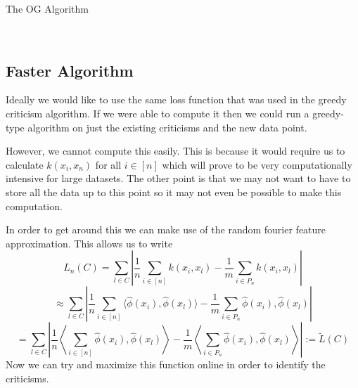 \documentclass{article}
\begin{document}
	
	\begin{algorithm}
		\caption{The OG Algorithm}\label{OnlineGreedy}
		\begin{algorithmic}[1]
			
			\EndIf
			\EndFor\\
			
		\end{algorithmic}
	\end{algorithm}
	
	\subsection{Faster Algorithm}
	Ideally we would like to use the same loss function that was used in the greedy criticism algorithm. If we were able to compute it then we could run a greedy-type algorithm on just the existing criticisms and the new data point. 
	
	However, we cannot compute this easily. This is because it would require us to calculate $k(x_i, x_n)$ for all $i \in \left[ n \right]$ which will prove to be very computationally intensive for large datasets. The other point is that we may not want to have to store all the data up to this point so it may not even be possible to make this computation. 
	
	In order to get around this we can make use of the random fourier feature approximation. This allows us to write 
	\begin{equation}
	L_n(C) = \sum_{l \in C}\left| \frac{1}{n}\sum_{i \in \left[ n \right]}k(x_i, x_l) - \frac{1}{m}\sum_{i \in P_n}k(x_i, x_l) \right|
	\end{equation}
	\begin{equation}
	\approx
	\sum_{l \in C}\left| \frac{1}{n}
	\sum_{i \in \left[ n \right]}\langle \hat{\phi}(x_i),  \hat{\phi}(x_l)\rangle 
	- \frac{1}{m}
	\sum_{i \in P_n}\hat{\phi}(x_i),  \hat{\phi}(x_l) \right| 
	\end{equation}	
	\begin{equation}
	= 
	\sum_{l \in C}\left| \frac{1}{n}
	\left\langle 
	\sum_{i \in \left[ n \right]}\hat{\phi}(x_i),  \hat{\phi}(x_l)
	\right\rangle 
	- \frac{1}{m}
	\left\langle
	\sum_{i \in P_n}\hat{\phi}(x_i),  \hat{\phi}(x_l)
	\right\rangle 
	\right| 
	:= 
	\tilde{L}(C)
	\end{equation}
	Now we can try and maximize this function online in order to identify the criticisms. 
	
\end{document}
